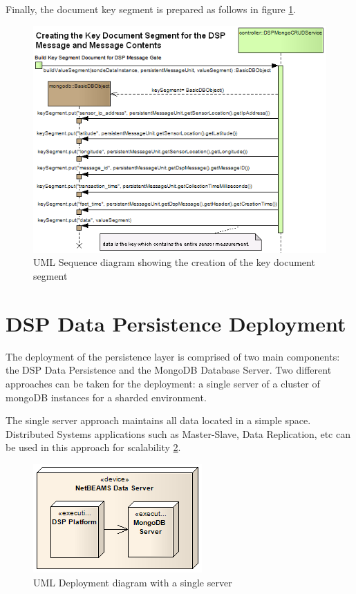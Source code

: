 Finally, the document key segment is prepared as follows in figure
\ref{fig:From-Creating-Key-Segment-Sequence}.

\begin{figure}[!b]
  \centering
  \includegraphics[scale=0.5]{../diagrams/From-Creating-Key-Segment-Sequence}
  \caption{UML Sequence diagram showing the creation of the key document segment}
  \label{fig:From-Creating-Key-Segment-Sequence}
\end{figure}

\section{DSP Data Persistence Deployment}

The deployment of the persistence layer is comprised of two main
components: the DSP Data Persistence and the MongoDB Database Server. Two
different approaches can be taken for the deployment: a single server of a
cluster of mongoDB instances for a sharded environment.

The single server approach maintains all data located in a simple space.
Distributed Systems applications such as Master-Slave, Data Replication, etc
can be used in this approach for scalability
\ref{fig:DSP-Data-Persistence-Deployment-Single}. 

\begin{figure}[!b]
  \centering
  \includegraphics[scale=0.7]{../diagrams/DSP-Data-Persistence-Deployment-Single}
  \caption{UML Deployment diagram with a single server}
  \label{fig:DSP-Data-Persistence-Deployment-Single}
\end{figure}

